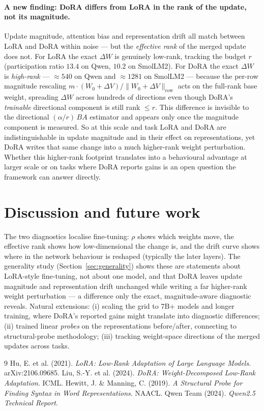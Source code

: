 \documentclass[11pt,a4paper]{article}
\begin{document}
\paragraph{A new finding: DoRA differs from LoRA in the rank of the update, not
its magnitude.} Update magnitude, attention bias and representation drift all
match between LoRA and DoRA within noise --- but the \emph{effective rank} of the
merged update does not. For LoRA the exact $\Delta W$ is genuinely low-rank,
tracking the budget $r$ (participation ratio $13.4$ on Qwen, $10.2$ on SmolLM2).
For DoRA the exact $\Delta W$ is \emph{high-rank} --- $\approx 540$ on Qwen and
$\approx 1281$ on SmolLM2 --- because the per-row magnitude rescaling
$m\cdot(W_0+\Delta V)/\lVert W_0+\Delta V\rVert_{\text{row}}$ acts on the
full-rank base weight, spreading $\Delta W$ across hundreds of directions even
though DoRA's \emph{trainable} directional component is still rank $\le r$. This
difference is invisible to the directional $(\alpha/r)\,BA$ estimator and appears
only once the magnitude component is measured. So at this scale and task LoRA and
DoRA are indistinguishable in update magnitude and in their effect on
representations, yet DoRA writes that same change into a much higher-rank weight
perturbation. Whether this higher-rank footprint translates into a behavioural
advantage at larger scale or on tasks where DoRA reports gains is an open
question the framework can answer directly.

\section{Discussion and future work}
The two diagnostics localise fine-tuning: $\rho$ shows which weights move, the
effective rank shows how low-dimensional the change is, and the drift curve shows
where in the network behaviour is reshaped (typically the later layers). The generality study
(Section~\ref{sec:generality}) shows these are statements about LoRA-style
fine-tuning, not about one model, and that DoRA leaves update magnitude and
representation drift unchanged while writing a far higher-rank weight
perturbation --- a difference only the exact, magnitude-aware diagnostic reveals.
Natural extensions: (i) scaling the grid to 7B+ models and longer training,
where DoRA's reported gains might translate into diagnostic differences;
(ii) trained linear \emph{probes} on the representations before/after,
connecting to structural-probe methodology; (iii) tracking weight-space
directions of the merged updates across tasks.

\begin{thebibliography}{9}
 Hu, E. et al. (2021). \emph{LoRA: Low-Rank Adaptation of Large Language Models}. arXiv:2106.09685.
 Liu, S.-Y. et al. (2024). \emph{DoRA: Weight-Decomposed Low-Rank Adaptation}. ICML.
 Hewitt, J. \& Manning, C. (2019). \emph{A Structural Probe for Finding Syntax in Word Representations}. NAACL.
 Qwen Team (2024). \emph{Qwen2.5 Technical Report}.
\end{thebibliography}
\end{document}
